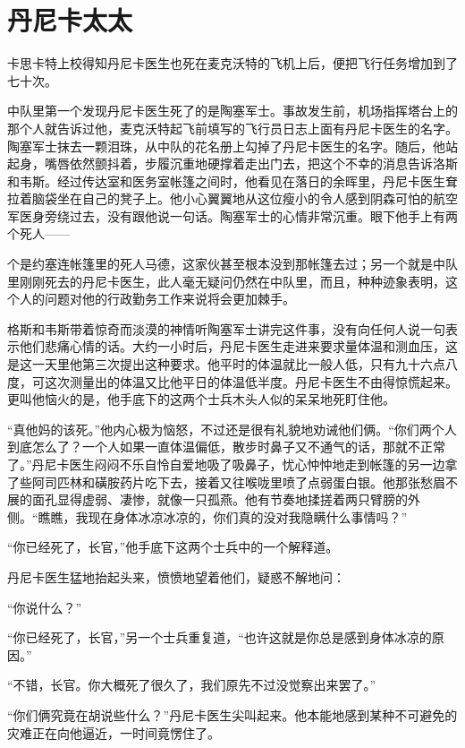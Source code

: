\chapter{丹尼卡太太}
 
    卡思卡特上校得知丹尼卡医生也死在麦克沃特的飞机上后，便把飞行任务增加到了七十次。

    中队里第一个发现丹尼卡医生死了的是陶塞军士。事故发生前，机场指挥塔台上的那个人就告诉过他，麦克沃特起飞前填写的飞行员日志上面有丹尼卡医生的名字。陶塞军士抹去一颗泪珠，从中队的花名册上勾掉了丹尼卡医生的名字。随后，他站起身，嘴唇依然颤抖着，步履沉重地硬撑着走出门去，把这个不幸的消息告诉洛斯和韦斯。经过传达室和医务室帐篷之间时，他看见在落日的余晖里，丹尼卡医生耷拉着脑袋坐在自己的凳子上。他小心翼翼地从这位瘦小的令人感到阴森可怕的航空军医身旁绕过去，没有跟他说一句话。陶塞军士的心情非常沉重。眼下他手上有两个死人——

    个是约塞连帐篷里的死人马德，这家伙甚至根本没到那帐篷去过；另一个就是中队里刚刚死去的丹尼卡医生，此人毫无疑问仍然在中队里，而且，种种迹象表明，这个人的问题对他的行政勤务工作来说将会更加棘手。

    格斯和韦斯带着惊奇而淡漠的神情听陶塞军士讲完这件事，没有向任何人说一句表示他们悲痛心情的话。大约一小时后，丹尼卡医生走进来要求量体温和测血压，这是这一天里他第三次提出这种要求。他平时的体温就比一般人低，只有九十六点八度，可这次测量出的体温又比他平日的体温低半度。丹尼卡医生不由得惊慌起来。更叫他恼火的是，他手底下的这两个士兵木头人似的呆呆地死盯住他。

    “真他妈的该死。”他内心极为恼怒，不过还是很有礼貌地劝诫他们俩。“你们两个人到底怎么了？一个人如果一直体温偏低，散步时鼻子又不通气的话，那就不正常了。”丹尼卡医生闷闷不乐自怜自爱地吸了吸鼻子，忧心忡忡地走到帐篷的另一边拿了些阿司匹林和磺胺药片吃下去，接着又往喉咙里喷了点弱蛋白银。他那张愁眉不展的面孔显得虚弱、凄惨，就像一只孤燕。他有节奏地揉搓着两只臂膀的外侧。“瞧瞧，我现在身体冰凉冰凉的，你们真的没对我隐瞒什么事情吗？”

    “你已经死了，长官，”他手底下这两个士兵中的一个解释道。

    丹尼卡医生猛地抬起头来，愤愤地望着他们，疑惑不解地问：

    “你说什么？”

    “你已经死了，长官，”另一个士兵重复道，“也许这就是你总是感到身体冰凉的原因。”

    “不错，长官。你大概死了很久了，我们原先不过没觉察出来罢了。”

    “你们俩究竟在胡说些什么？”丹尼卡医生尖叫起来。他本能地感到某种不可避免的灾难正在向他逼近，一时间竟愣住了。

